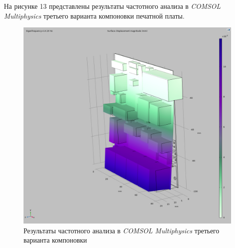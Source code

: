 На рисунке 13 представлены результаты частотного анализа в \textit{COMSOL Multiphysics} третьего варианта компоновки печатной платы.

\begin{figure}[H]
  \centering
  \includegraphics[scale=0.3]{../img/sst-3/freq/comsol.png}
  \caption{Результаты частотного анализа в \textit{COMSOL Multiphysics}
    третьего варианта компоновки}
\end{figure}
